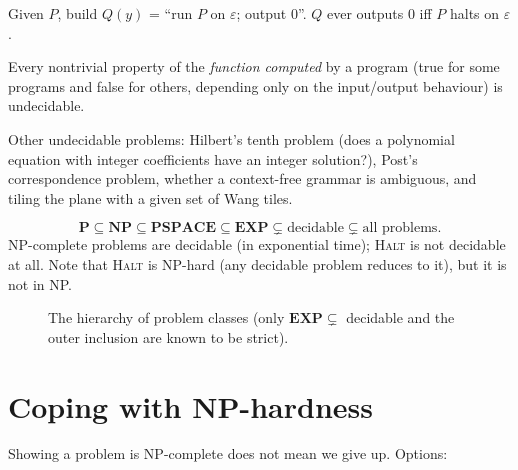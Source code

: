 \begin{example}
Given $P$, build $Q(y)$ = ``run $P$ on $\varepsilon$; output 0''. $Q$ ever outputs 0 iff $P$ halts on $\varepsilon$.
\end{example}

\begin{theorem}
Every nontrivial property of the \emph{function computed} by a program (true for some programs and false for others, depending only on the input/output behaviour)
is undecidable.
\end{theorem}
Other undecidable problems: Hilbert's tenth problem (does a polynomial equation with integer coefficients have an integer solution?), Post's correspondence problem,
whether a context-free grammar is ambiguous, and tiling the plane with a given set of Wang tiles.

\begin{important}[Hierarchy]
\[
\mathbf P\subseteq\mathbf{NP}\subseteq\mathbf{PSPACE}\subseteq\mathbf{EXP}\subsetneq\text{decidable}\subsetneq\text{all problems}.
\]
NP-complete problems are decidable (in exponential time); \textsc{Halt} is not decidable at all. Note that \textsc{Halt} is NP-hard
(any decidable problem reduces to it), but it is not in NP.
\end{important}

\begin{figure}[H]
\centering
{}
\caption{The hierarchy of problem classes (only $\mathbf{EXP}\subsetneq$
decidable and the outer inclusion are known to be strict).}
\end{figure}

\section{Coping with NP-hardness}
Showing a problem is NP-complete does not mean we give up. Options:

